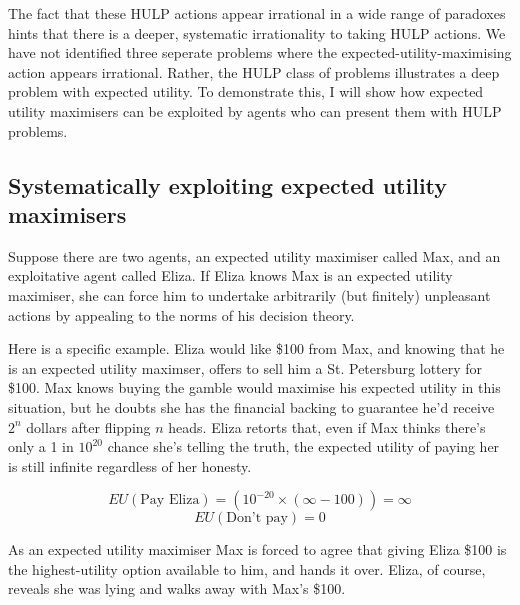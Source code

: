\documentclass{article}
\begin{document}
The fact that these HULP actions appear irrational in a wide range of paradoxes hints that there is a deeper, systematic irrationality to taking HULP actions. We have not identified three seperate problems where the expected-utility-maximising action appears irrational. Rather, the HULP class of problems illustrates a deep problem with expected utility. To demonstrate this, I will show how expected utility maximisers can be exploited by agents who can present them with HULP problems.

\subsection{Systematically exploiting expected utility maximisers}

Suppose there are two agents, an expected utility maximiser called Max, and an exploitative agent called Eliza. If Eliza knows Max is an expected utility maximiser, she can force him to undertake arbitrarily (but finitely) unpleasant actions by appealing to the norms of his decision theory. 

Here is a specific example. Eliza would like \$100 from Max, and knowing that he is an expected utility maximser, offers to sell him a St. Petersburg lottery for \$100. Max knows buying the gamble would maximise his expected utility in this situation, but he doubts she has the financial backing to guarantee he'd receive \(2^n\) dollars after flipping \(n\) heads. Eliza retorts that, even if Max thinks there's only a 1 in \(10^{20}\) chance she's telling the truth, the expected utility of paying her is still infinite regardless of her honesty.

\[EU(\mbox{Pay Eliza})=(10^{-20}\times(\infty-100)) = \infty\]
\[EU(\mbox{Don't pay})=0\]

As an expected utility maximiser Max is forced to agree that giving Eliza \$100 is the highest-utility option available to him, and hands it over. Eliza, of course, reveals she was lying and walks away with Max's \$100.
\end{document}
